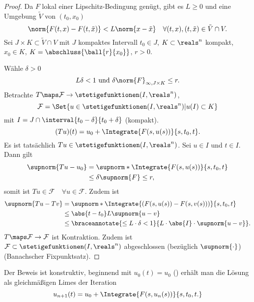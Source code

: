 \begin{proof}
  Da \( F \) lokal einer Lipschitz-Bedingung genügt, gibt es \( L\geq 0 \) und eine Umgebung \( \tilde{V} \) von \( (t_0,x_0) \) \sd
  \begin{equation*}
    \norm{F(t,x)-F(t,\tilde{x})}< L\norm{x-\tilde{x}}\quad \forall (t,x),(t,\tilde{x})\in \tilde{V}\cap V.
  \end{equation*}
  Sei \( J\times K\subset \tilde{V}\cap V \) mit \( J \) kompaktes Intervall \( t_0\in J \), \( K\subset \reals^n \) kompakt, \( x_0\in K \), \obda \( K=\abschluss{\ball{r}{x_0}} \), \( r>0 \). 
  
  Wähle \( \delta>0 \) \sd
  \begin{equation*}
    L\delta<1 \text{ und }\delta\norm{F}_{\infty, J\times K}\leq r.
  \end{equation*}
  Betrachte \( T\maps \mathcal{F}\to \stetigefunktionen(I,\reals^n) \),
  \begin{equation*}
    \mathcal{F}=\Set{u\in \stetigefunktionen(I,\reals^n)|u(I)\subset K}
  \end{equation*}
  mit \( I=J\cap \interval{t_0-\delta}{t_0+\delta} \) (kompakt).
  \begin{equation*}
    (Tu)(t)=u_0+\Integrate{F(s,u(s))}{s,t_0,t}.
  \end{equation*}
  Es ist tatsächlich \( Tu\in \stetigefunktionen(I,\reals^n) \). Sei \( u\in I \) und \( t\in I \). Dann gilt
  \begin{align*}
    \supnorm{Tu-u_0}&=\supnorm*{\Integrate{F(s,u(s))}{s,t_0,t}}\\
    &\leq \delta\supnorm{F}\leq r,
  \end{align*}
  somit ist \( Tu\in \mathcal{F}\quad \forall u\in \mathcal{F} \). Zudem ist 
  \begin{align*}
    \supnorm{Tu-Tv}&=\supnorm*{\Integrate{(F(s,u(s))-F(s,v(s)))}{s,t_0,t}}\\
    &\leq\abs{t-t_0}L\supnorm{u-v}\\
    &\leq \braceannotate{\leq L\cdot \delta<1}{L\cdot \abs{I}\cdot\supnorm{u-v}}.
  \end{align*}
  \timplies \( T\maps \mathcal{F}\to \mathcal{F} \) ist Kontraktion. Zudem ist \( \mathcal{F}\subset \stetigefunktionen(I,\reals^n) \)   abgeschlossen (bezüglich \( \supnorm{\cdot} \)) \timplies \Beh (Banachscher Fixpunktsatz).

  
\end{proof}
\begin{bemerkung*}
  Der Beweis ist konstruktiv, \dh beginnend mit \( u_0(t)=u_0 \) (\zb) erhält man die Lösung als gleichmäßigen Limes der Iteration
  \begin{equation*}
    u_{n+1}(t)=u_0+\Integrate{F(s,u_n(s))}{s,t_0,t.}
  \end{equation*}
\end{bemerkung*}
